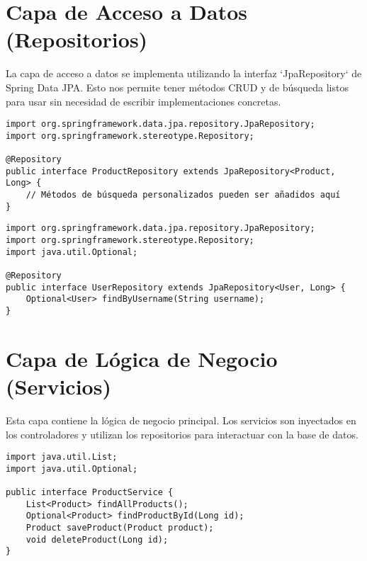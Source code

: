 \documentclass[12pt, a4paper]{article}
\begin{document}
\section{Capa de Acceso a Datos (Repositorios)}
La capa de acceso a datos se implementa utilizando la interfaz `JpaRepository` de Spring Data JPA. Esto nos permite tener métodos CRUD y de búsqueda listos para usar sin necesidad de escribir implementaciones concretas.

\begin{lstlisting}[style=javastyle, caption={Interfaz `ProductRepository`}, label=lst:productrepo]
import org.springframework.data.jpa.repository.JpaRepository;
import org.springframework.stereotype.Repository;

@Repository
public interface ProductRepository extends JpaRepository<Product, Long> {
    // Métodos de búsqueda personalizados pueden ser añadidos aquí
}
\end{lstlisting}

\begin{lstlisting}[style=javastyle, caption={Interfaz `UserRepository`}, label=lst:userrepo]
import org.springframework.data.jpa.repository.JpaRepository;
import org.springframework.stereotype.Repository;
import java.util.Optional;

@Repository
public interface UserRepository extends JpaRepository<User, Long> {
    Optional<User> findByUsername(String username);
}
\end{lstlisting}

\section{Capa de Lógica de Negocio (Servicios)}
Esta capa contiene la lógica de negocio principal. Los servicios son inyectados en los controladores y utilizan los repositorios para interactuar con la base de datos.

\begin{lstlisting}[style=javastyle, caption={Interfaz `ProductService`}, label=lst:productservice]
import java.util.List;
import java.util.Optional;

public interface ProductService {
    List<Product> findAllProducts();
    Optional<Product> findProductById(Long id);
    Product saveProduct(Product product);
    void deleteProduct(Long id);
}
\end{lstlisting}
\end{document}

